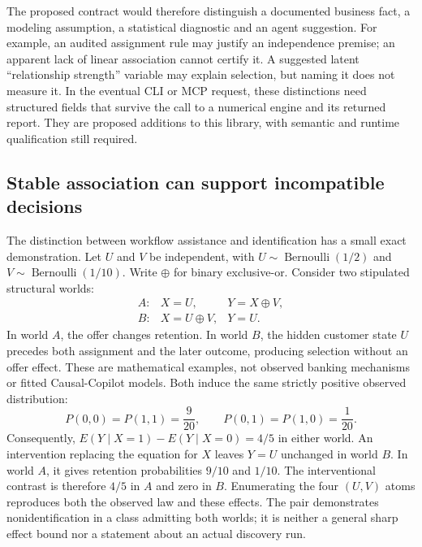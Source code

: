 The proposed contract would therefore distinguish a documented business fact,
a modeling assumption, a statistical diagnostic and an agent suggestion.
For example, an audited assignment rule may justify an independence premise;
an apparent lack of linear association cannot certify it. A suggested latent
``relationship strength'' variable may explain selection, but naming it does
not measure it. In the eventual CLI or MCP request, these distinctions need
structured fields that survive the call to a numerical engine and its returned
report. They are proposed additions to this library, with semantic and runtime
qualification still required.

\subsection{Stable association can support incompatible decisions}

The distinction between workflow assistance and identification has a small
exact demonstration. Let $U$ and $V$ be independent, with
$U\sim\operatorname{Bernoulli}(1/2)$ and
$V\sim\operatorname{Bernoulli}(1/10)$. Write $\oplus$ for binary exclusive-or.
Consider two stipulated structural worlds:
\begin{equation}
 \begin{array}{lll}
 A:& X=U,&Y=X\oplus V,\\
 B:& X=U\oplus V,&Y=U.
 \end{array}
 \label{exec17:copilot-worlds}
\end{equation}
In world $A$, the offer changes retention. In world $B$, the hidden customer
state $U$ precedes both assignment and the later outcome, producing selection
without an offer effect. These are mathematical examples, not observed banking
mechanisms or fitted Causal-Copilot models. Both induce the same strictly
positive observed distribution:
\begin{equation}
 P(0,0)=P(1,1)=\frac9{20},\qquad
 P(0,1)=P(1,0)=\frac1{20}.
 \label{exec17:copilot-observed}
\end{equation}
Consequently, $E(Y\mid X=1)-E(Y\mid X=0)=4/5$ in either world.
An intervention replacing the equation for $X$ leaves $Y=U$ unchanged in
world $B$. In world $A$, it gives retention probabilities $9/10$ and $1/10$.
The interventional contrast is therefore $4/5$ in $A$ and zero in $B$.
Enumerating the four $(U,V)$ atoms reproduces both the observed law and these
effects. The pair demonstrates nonidentification in a class admitting both
worlds; it is neither a general sharp effect bound nor a statement about an
actual discovery run.~\citep{exec17_copilot_exact}

